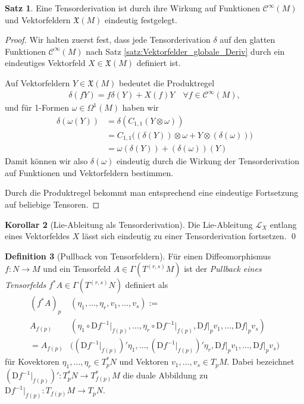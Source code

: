 \documentclass[a4paper]{scrreprt}
\numberwithin{equation}{chapter}
\newcommand{\DD}{\mathrm{D}}
\newcommand{\sC}{\mathcal{C}^{\infty}}
\newcommand{\vf}{\mathfrak{X}}
\theoremstyle{definition}
\newtheorem{defn}{Definition}[section]
\newtheorem{satz}[defn]{Satz}
\newtheorem{kor}[defn]{Korollar}
\begin{document}
		\begin{satz}\label{satz:Fortsetzung_Derivationen}
			Eine Tensorderivation ist durch ihre Wirkung auf Funktionen $\sC(M)$ und Vektorfeldern $\vf(M)$ eindeutig festgelegt.
			\begin{proof}
				Wir halten zuerst fest, dass jede Tensorderivation $\delta$ auf den glatten Funktionen $\sC(M)$ nach Satz \ref{satz:Vektorfelder_globale_Deriv} durch ein eindeutiges Vektorfeld $X\in\vf(M)$ definiert ist.
				
				Auf Vektorfeldern $Y\in\vf(M)$ bedeutet die Produktregel
				\begin{align*}
					\delta(fY)=f\delta(Y)+X(f)Y \quad\forall f\in\sC(M),
				\end{align*}
				und für 1-Formen $\omega\in\Omega^1(M)$ haben wir
				\begin{align*}
					\delta(\omega(Y)) &= \delta(C_{1,1}(Y\otimes\omega))\\
					&= C_{1,1}\Big( (\delta(Y))\otimes\omega + Y\otimes(\delta(\omega)) \Big)\\
					&= \omega(\delta(Y)) + (\delta(\omega))(Y)
				\end{align*}
				Damit können wir also $\delta(\omega)$ eindeutig durch die Wirkung der Tensorderivation auf Funktionen und Vektorfeldern bestimmen.
				
				Durch die Produktregel bekommt man entsprechend eine eindeutige Fortsetzung auf beliebige Tensoren.
			\end{proof}
		\end{satz}
		
		\begin{kor}[Lie-Ableitung als Tensorderivation]
			Die Lie-Ableitung $\mathcal{L}_X$ entlang eines Vektorfeldes $X$ lässt sich eindeutig zu einer Tensorderivation fortsetzen. \qed
		\end{kor}
		
		\begin{defn}[Pullback von Tensorfeldern]
			Für einen Diffeomorphismus $f\colon N\rightarrow M$ und ein Tensorfeld $A\in \Gamma(T^{(r,s)}M)$ ist der \emph{Pullback eines Tensorfelds} $f^*A\in\Gamma(T^{(r,s)}N)$ definiert als
			\begin{align*}
				(f^*A)_p&(\eta_1,\ldots,\eta_r,v_1,\ldots,v_s):=\\
				A_{f(p)}&(\eta_1\circ\DD f^{-1}\vert_{f(p)},\ldots,\eta_r\circ\DD f^{-1}\vert_{f(p)},\DD f\vert_pv_1,\ldots,\DD f\vert_pv_s)\\
				= A_{f(p)}& \Big((\DD f^{-1}\vert_{f(p)})' \eta_1, \ldots, (\DD f^{-1}\vert_{f(p)})' \eta_r, \DD f\vert_pv_1,\ldots,\DD f\vert_pv_s \Big)
			\end{align*}
			für Kovektoren $\eta_1,\dots,\eta_r \in T_p^*N$ und Vektoren $v_1,\dots,v_s \in T_pM$. Dabei bezeichnet $(\DD f^{-1}\vert_{f(p)})' \colon T_p^*N \to T_{f(p)}^*M$ die duale Abbildung zu $\DD f^{-1}\vert_{f(p)}\colon T_{f(p)}M \to T_pN$.
		\end{defn}
		
\end{document}
